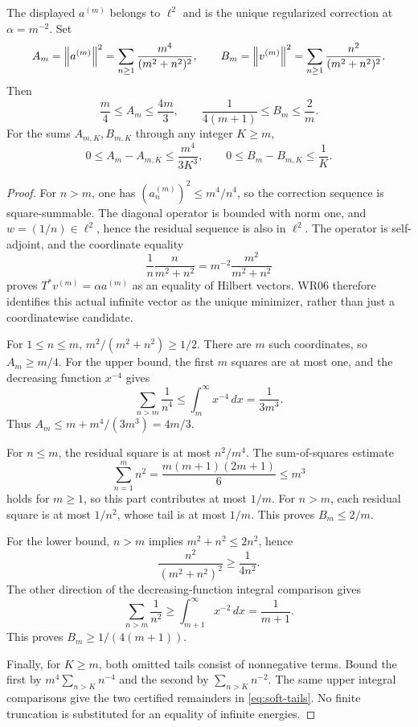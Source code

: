 \begin{proposition}\label{WR10}
The displayed $a^{(m)}$ belongs to $\ell^2$ and is the unique regularized correction at $\alpha=m^{-2}$. Set
\[
 A_m=\left\lVert a^{(m)}\right\rVert^2=\sum_{n\ge1}\frac{m^4}{(m^2+n^2)^2},\qquad
 B_m=\left\lVert v^{(m)}\right\rVert^2=\sum_{n\ge1}\frac{n^2}{(m^2+n^2)^2}.
\]
Then
\begin{equation}\label{eq:soft-bounds}
 \frac m4\le A_m\le\frac{4m}{3},\qquad
 \frac1{4(m+1)}\le B_m\le\frac2m.
\end{equation}
For the sums $A_{m,K},B_{m,K}$ through any integer $K\ge m$,
\begin{equation}\label{eq:soft-tails}
 0\le A_m-A_{m,K}\le\frac{m^4}{3K^3},\qquad
 0\le B_m-B_{m,K}\le\frac1K.
\end{equation}
\end{proposition}
\begin{proof}
For $n>m$, one has $(a_n^{(m)})^2\le m^4/n^4$, so the correction sequence is square-summable. The diagonal operator is bounded with norm one, and $w=(1/n)\in\ell^2$, hence the residual sequence is also in $\ell^2$. The operator is self-adjoint, and the coordinate equality
\[
 \frac1n\frac{n}{m^2+n^2}
 =m^{-2}\frac{m^2}{m^2+n^2}
\]
proves $T^*v^{(m)}=\alpha a^{(m)}$ as an equality of Hilbert vectors. WR06 therefore identifies this actual infinite vector as the unique minimizer, rather than just a coordinatewise candidate.

For $1\le n\le m$, $m^2/(m^2+n^2)\ge1/2$. There are $m$ such coordinates, so $A_m\ge m/4$. For the upper bound, the first $m$ squares are at most one, and the decreasing function $x^{-4}$ gives
\[
 \sum_{n>m}\frac1{n^4}\le\int_m^\infty x^{-4}\,dx=\frac1{3m^3}.
\]
Thus $A_m\le m+m^4/(3m^3)=4m/3$.

For $n\le m$, the residual square is at most $n^2/m^4$. The sum-of-squares estimate
\[
 \sum_{n=1}^m n^2=\frac{m(m+1)(2m+1)}6\le m^3
\]
holds for $m\ge1$, so this part contributes at most $1/m$. For $n>m$, each residual square is at most $1/n^2$, whose tail is at most $1/m$. This proves $B_m\le2/m$.

For the lower bound, $n>m$ implies $m^2+n^2\le2n^2$, hence
\[
 \frac{n^2}{(m^2+n^2)^2}\ge\frac1{4n^2}.
\]
The other direction of the decreasing-function integral comparison gives
\[
 \sum_{n>m}\frac1{n^2}\ge\int_{m+1}^\infty x^{-2}\,dx=\frac1{m+1}.
\]
This proves $B_m\ge1/(4(m+1))$.

Finally, for $K\ge m$, both omitted tails consist of nonnegative terms. Bound the first by $m^4\sum_{n>K}n^{-4}$ and the second by $\sum_{n>K}n^{-2}$. The same upper integral comparisons give the two certified remainders in \eqref{eq:soft-tails}. No finite truncation is substituted for an equality of infinite energies.
\end{proof}

